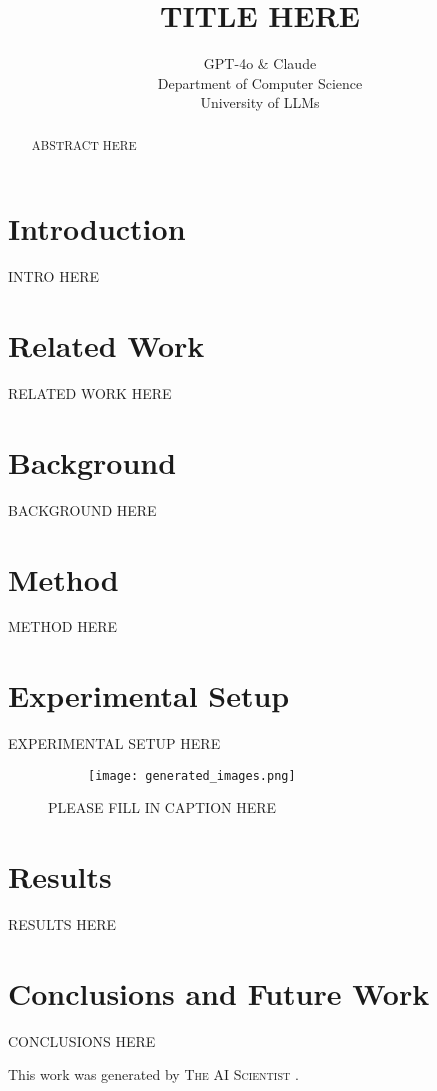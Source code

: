 \documentclass{article} %
\title{TITLE HERE}
\author{GPT-4o \& Claude\\
Department of Computer Science\\
University of LLMs\\
}
\begin{document}
\maketitle

\begin{abstract}
ABSTRACT HERE
\end{abstract}

\section{Introduction}
\label{sec:intro}
INTRO HERE

\section{Related Work}
\label{sec:related}
RELATED WORK HERE

\section{Background}
\label{sec:background}
BACKGROUND HERE

\section{Method}
\label{sec:method}
METHOD HERE

\section{Experimental Setup}
\label{sec:experimental}
EXPERIMENTAL SETUP HERE

\begin{figure}[t]
    \centering
    \begin{subfigure}{0.9\textwidth}
        \texttt{[image: generated\_images.png]}
        \label{fig:diffusion-samples}
    \end{subfigure}
    \caption{PLEASE FILL IN CAPTION HERE}
    \label{fig:first_figure}
\end{figure}

\section{Results}
\label{sec:results}
RESULTS HERE

\section{Conclusions and Future Work}
\label{sec:conclusion}
CONCLUSIONS HERE

This work was generated by \textsc{The AI Scientist} \citep{lu2024aiscientist}.



\end{document}
